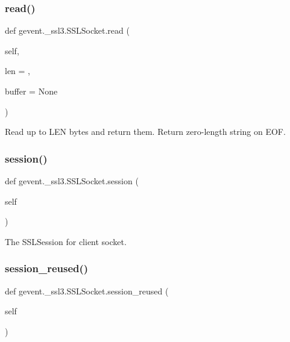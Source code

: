 \subsubsection{\texorpdfstring{read()}{read()}}
{\footnotesize\ttfamily def gevent.\+\_\+ssl3.\+S\+S\+L\+Socket.\+read (\begin{DoxyParamCaption}\item[{}]{self,  }\item[{}]{len = {},  }\item[{}]{buffer = {\ttfamily None} }\end{DoxyParamCaption})}

\begin{DoxyVerb}Read up to LEN bytes and return them.
Return zero-length string on EOF.\end{DoxyVerb}
 \mbox{\label{classgevent_1_1__ssl3_1_1_s_s_l_socket_ae1b9bcf22ac37c8779c1efc923377b80}} 
\subsubsection{\texorpdfstring{session()}{session()}}
{\footnotesize\ttfamily def gevent.\+\_\+ssl3.\+S\+S\+L\+Socket.\+session (\begin{DoxyParamCaption}\item[{}]{self }\end{DoxyParamCaption})}

\begin{DoxyVerb}The SSLSession for client socket.\end{DoxyVerb}
 \mbox{\label{classgevent_1_1__ssl3_1_1_s_s_l_socket_a7a93424c8d33b6ca28f227c4ed862b5d}} 
\subsubsection{\texorpdfstring{session\+\_\+reused()}{session\_reused()}}
{\footnotesize\ttfamily def gevent.\+\_\+ssl3.\+S\+S\+L\+Socket.\+session\+\_\+reused (\begin{DoxyParamCaption}\item[{}]{self }\end{DoxyParamCaption})}

